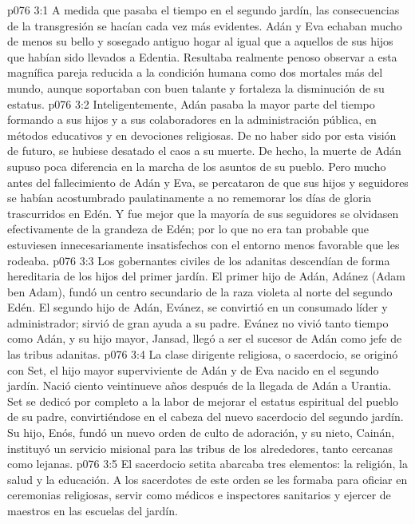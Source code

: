 \vs p076 3:1 A medida que pasaba el tiempo en el segundo jardín, las consecuencias de la transgresión se hacían cada vez más evidentes. Adán y Eva echaban mucho de menos su bello y sosegado antiguo hogar al igual que a aquellos de sus hijos que habían sido llevados a Edentia. Resultaba realmente penoso observar a esta magnífica pareja reducida a la condición humana como dos mortales más del mundo, aunque soportaban con buen talante y fortaleza la disminución de su estatus.
\vs p076 3:2 Inteligentemente, Adán pasaba la mayor parte del tiempo formando a sus hijos y a sus colaboradores en la administración pública, en métodos educativos y en devociones religiosas. De no haber sido por esta visión de futuro, se hubiese desatado el caos a su muerte. De hecho, la muerte de Adán supuso poca diferencia en la marcha de los asuntos de su pueblo. Pero mucho antes del fallecimiento de Adán y Eva, se percataron de que sus hijos y seguidores se habían acostumbrado paulatinamente a no rememorar los días de gloria trascurridos en Edén. Y fue mejor que la mayoría de sus seguidores se olvidasen efectivamente de la grandeza de Edén; por lo que no era tan probable que estuviesen innecesariamente insatisfechos con el entorno menos favorable que les rodeaba.
\vs p076 3:3 \pc Los gobernantes civiles de los adanitas descendían de forma hereditaria de los hijos del primer jardín. El primer hijo de Adán, Adánez (Adam ben Adam), fundó un centro secundario de la raza violeta al norte del segundo Edén. El segundo hijo de Adán, Evánez, se convirtió en un consumado líder y administrador; sirvió de gran ayuda a su padre. Evánez no vivió tanto tiempo como Adán, y su hijo mayor, Jansad, llegó a ser el sucesor de Adán como jefe de las tribus adanitas.
\vs p076 3:4 \pc La clase dirigente religiosa, o sacerdocio, se originó con Set, el hijo mayor superviviente de Adán y de Eva nacido en el segundo jardín. Nació ciento veintinueve años después de la llegada de Adán a Urantia. Set se dedicó por completo a la labor de mejorar el estatus espiritual del pueblo de su padre, convirtiéndose en el cabeza del nuevo sacerdocio del segundo jardín. Su hijo, Enós, fundó un nuevo orden de culto de adoración, y su nieto, Cainán, instituyó un servicio misional para las tribus de los alrededores, tanto cercanas como lejanas.
\vs p076 3:5 El sacerdocio setita abarcaba tres elementos: la religión, la salud y la educación. A los sacerdotes de este orden se les formaba para oficiar en ceremonias religiosas, servir como médicos e inspectores sanitarios y ejercer de maestros en las escuelas del jardín.
